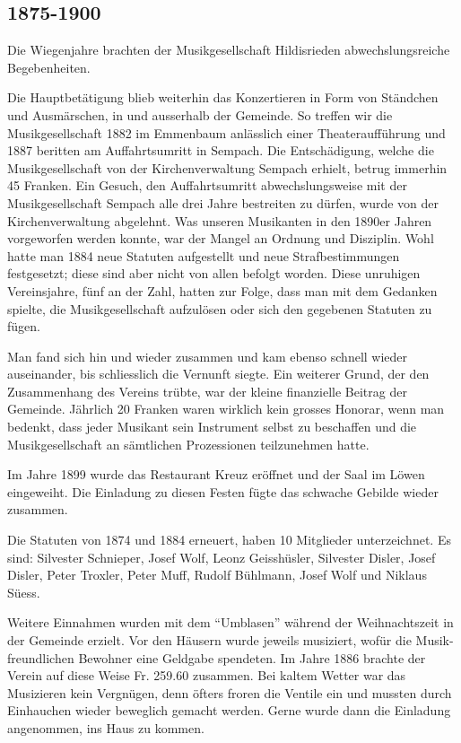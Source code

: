 \begin{history}

    \subsection{1875-1900}

    Die Wiegenjahre brachten der Musikgesellschaft Hildisrieden
    abwechslungsreiche Begebenheiten.

    Die Hauptbetätigung blieb weiterhin das Konzertieren in Form von Ständchen
    und Ausmärschen, in und ausserhalb der Gemeinde. So treffen wir die
    Musikgesellschaft 1882 im Emmenbaum anlässlich einer Theateraufführung und
    1887 beritten am Auffahrtsumritt in Sempach. Die Entschädigung, welche die
    Musikgesellschaft von der Kirchenverwaltung Sempach erhielt, betrug immerhin
    45 Franken. Ein Gesuch, den Auffahrtsumritt abwechslungsweise mit der
    Musikgesellschaft Sempach alle drei Jahre bestreiten zu dürfen, wurde von
    der Kirchenverwaltung abgelehnt. Was unseren Musikanten in den 1890er Jahren
    vorgeworfen werden konnte, war der Mangel an Ordnung    und Disziplin. Wohl
    hatte man 1884 neue Statuten aufgestellt und neue Strafbestimmungen
    festgesetzt; diese sind aber nicht von allen befolgt worden. Diese unruhigen
    Vereinsjahre, fünf an der Zahl, hatten zur Folge, dass man mit dem Gedanken
    spielte, die Musikgesellschaft aufzulösen oder sich den gegebenen Statuten
    zu fügen.

    Man fand sich hin und wieder zusammen und kam ebenso schnell wieder
    auseinander, bis schliesslich die Vernunft siegte. Ein weiterer Grund, der
    den Zusammenhang des Vereins trübte, war der kleine finanzielle Beitrag der
    Gemeinde. Jährlich 20 Franken waren wirklich kein grosses Honorar, wenn man
    bedenkt, dass jeder Musikant sein Instrument selbst zu beschaffen und die
    Musikgesellschaft an sämtlichen Prozessionen teilzunehmen hatte.

    Im Jahre 1899 wurde das Restaurant Kreuz eröffnet und der Saal im Löwen
    eingeweiht. Die Einladung zu diesen Festen fügte das schwache Gebilde wieder
    zusammen.

    Die Statuten von 1874 und 1884 erneuert, haben 10 Mitglieder unterzeichnet.
    Es sind: Silvester Schnieper, Josef Wolf, Leonz Geisshüsler, Silvester
    Disler, Josef Disler, Peter Troxler, Peter Muff, Rudolf Bühlmann, Josef Wolf
    und Niklaus Süess.

    Weitere Einnahmen wurden mit dem \enquote{Umblasen}  während der
    Weihnachtszeit in der Gemeinde erzielt. Vor den Häusern wurde jeweils
    musiziert, wofür die Musik-freundlichen Bewohner eine Geldgabe spendeten. Im
    Jahre 1886 brachte der Verein auf diese Weise Fr. 259.60 zusammen. Bei
    kaltem Wetter war das Musizieren kein Vergnügen, denn öfters froren die
    Ventile ein und mussten durch Einhauchen wieder beweglich gemacht werden.
    Gerne wurde dann die Einladung angenommen, ins Haus zu kommen.


\end{history}
